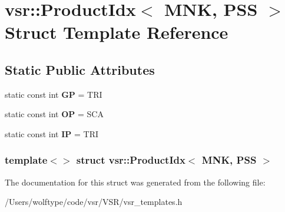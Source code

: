 \hypertarget{structvsr_1_1_product_idx_3_01_m_n_k_00_01_p_s_s_01_4}{\section{vsr\-:\-:Product\-Idx$<$ M\-N\-K, P\-S\-S $>$ Struct Template Reference}
\label{structvsr_1_1_product_idx_3_01_m_n_k_00_01_p_s_s_01_4}
}
\subsection*{Static Public Attributes}
\begin{DoxyCompactItemize}
\item 
\hypertarget{structvsr_1_1_product_idx_3_01_m_n_k_00_01_p_s_s_01_4_a4db22c8febfdc03386dbd05b5c6e114b}{static const int {\bfseries G\-P} = T\-R\-I}\label{structvsr_1_1_product_idx_3_01_m_n_k_00_01_p_s_s_01_4_a4db22c8febfdc03386dbd05b5c6e114b}

\item 
\hypertarget{structvsr_1_1_product_idx_3_01_m_n_k_00_01_p_s_s_01_4_a555a2b97c1532b374eb3d3fa0ef41ba0}{static const int {\bfseries O\-P} = S\-C\-A}\label{structvsr_1_1_product_idx_3_01_m_n_k_00_01_p_s_s_01_4_a555a2b97c1532b374eb3d3fa0ef41ba0}

\item 
\hypertarget{structvsr_1_1_product_idx_3_01_m_n_k_00_01_p_s_s_01_4_aa6c61cf2202ed2c7de117810e6b10b9c}{static const int {\bfseries I\-P} = T\-R\-I}\label{structvsr_1_1_product_idx_3_01_m_n_k_00_01_p_s_s_01_4_aa6c61cf2202ed2c7de117810e6b10b9c}

\end{DoxyCompactItemize}
\subsubsection*{template$<$$>$ struct vsr\-::\-Product\-Idx$<$ M\-N\-K, P\-S\-S $>$}



The documentation for this struct was generated from the following file\-:\begin{DoxyCompactItemize}
\item 
/\-Users/wolftype/code/vsr/\-V\-S\-R/vsr\-\_\-templates.\-h\end{DoxyCompactItemize}
